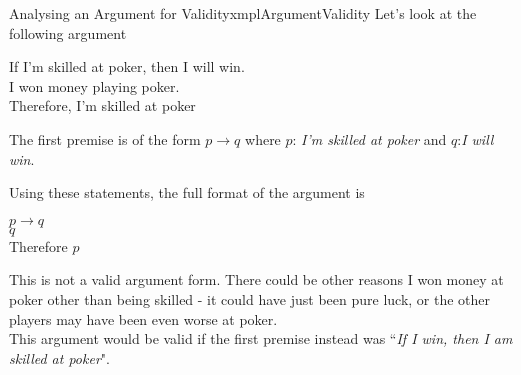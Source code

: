 \begin{exmpl}[label={exmpl:argumentValidity}]{Analysing an Argument for Validity}{xmplArgumentValidity}
    Let's look at the following argument\\
    \begin{center}
        If I'm skilled at poker, then I will win.\\

        I won money playing poker.\\

        Therefore, I'm skilled at poker
    \end{center}
    The first premise is of the form $p \to q$ where $p$: \emph{I'm skilled at poker} and $q$:\emph{I will win}.

    Using these statements, the full format of the argument is \\
    \begin{center}
        $p \to q$\\
        $q$\\
        Therefore $p$
    \end{center}

    This is not a valid argument form. There could be other reasons I won money at poker other than being skilled - it could have just been pure luck, or the other players may have been even worse at poker.\\

    This argument would be valid if the first premise instead was ``\emph{If I win, then I am skilled at poker}".
\end{exmpl}
